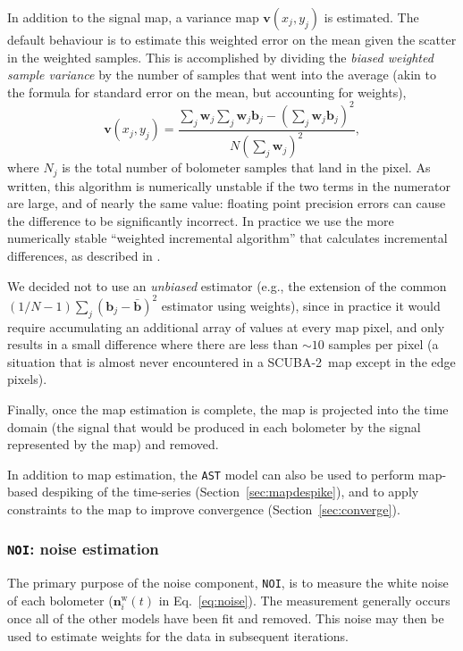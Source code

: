 \documentclass[useAMS,usenatbib,nofootinbib]{mn2e}
\newcommand{\scuba}{SCUBA-2}
\newcommand{\model}[1]{\texttt{#1}}
\begin{document}
In addition to the signal map, a variance map $\mathbf{v}(x_j,y_j)$ is
estimated. The default behaviour is to estimate this weighted error on
the mean given the scatter in the weighted samples. This is
accomplished by dividing the \emph{biased weighted sample variance} by
the number of samples that went into the average (akin to the formula
for standard error on the mean, but accounting for weights),
%
\begin{equation}
\label{eq:varmap}
\mathbf{v}(x_j,y_j) = \frac{\sum_j \mathbf{w}_j
                            \sum_j \mathbf{w}_j \mathbf{b}_j -
                            \left( \sum_j \mathbf{w}_j \mathbf{b}_j \right)^2 }
                           { N \left( \sum_j \mathbf{w}_j \right)^2 },
\end{equation}
%
where $N_j$ is the total number of bolometer samples that land in the
pixel. As written, this algorithm is numerically unstable if the two
terms in the numerator are large, and of nearly the same value:
floating point precision errors can cause the difference to be
significantly incorrect. In practice we use the more numerically
stable ``weighted incremental algorithm'' that calculates incremental
differences, as described in \citet{west1979}.

 We decided not to use an \emph{unbiased} estimator (e.g., the
extension of the common $(1/N-1)\sum_j (\mathbf{b}_j -
\bar{\mathbf{b}})^2$ estimator using weights), since in practice it
would require accumulating an additional array of values at every map
pixel, and only results in a small difference where there are less
than $\sim10$ samples per pixel (a situation that is almost never
encountered in a \scuba\ map except in the edge pixels).

Finally, once the map estimation is complete, the map is projected
into the time domain (the signal that would be produced in each
bolometer by the signal represented by the map) and removed.

In addition to map estimation, the \model{AST} model can also be used
to perform map-based despiking of the time-series
(Section~\ref{sec:mapdespike}), and to apply constraints to the map to
improve convergence (Section~\ref{sec:converge}).

\subsubsection{\model{NOI}: noise estimation}
\label{sec:noi}

The primary purpose of the noise component, \model{NOI}, is to measure
the white noise of each bolometer ($\mathbf{n}^\mathrm{w}_i(t)$ in
Eq.~\ref{eq:noise}). The measurement generally occurs once all of the
other models have been fit and removed. This noise may then be used to
estimate weights for the data in subsequent iterations.
\end{document}
